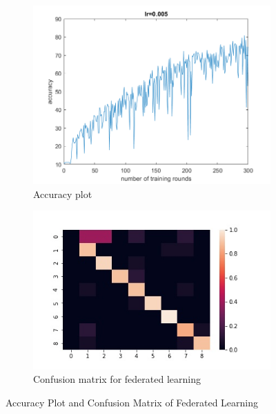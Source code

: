 \documentclass[11pt]{article}
\begin{document}
\begin{figure}[h!]
  \centering
  \begin{subfigure}[b]{0.4\linewidth}
    \includegraphics[width=\linewidth]{training.png}
    \caption{Accuracy plot}
  \end{subfigure}
  \begin{subfigure}[b]{0.45\linewidth}
    \includegraphics[width=\linewidth]{fedStanford901lr005.jpg}
    \caption{Confusion matrix for federated learning}
  \end{subfigure}
  \caption{Accuracy Plot and Confusion Matrix of Federated Learning}
  \label{fig:fedtraining}
\end{figure}
\end{document}
